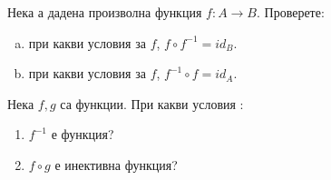 \begin{problem}
  Нека а дадена произволна функция $f:A \to B$.
  Проверете:
  \begin{enumerate}[a)]
  \item
    при какви условия за $f$, $f\circ f^{-1} = id_{B}$.
  \item
     при какви условия за $f$, $f^{-1}\circ f = id_{A}$.
  \end{enumerate}
\end{problem}
\newpage
\begin{problem}%
  Нека $f,g$ са функции. При какви условия :
  \begin{enumerate}
  \item
    $f^{-1}$ е функция?
  \item
    $f\circ g$ е инективна функция?
  \end{enumerate}
\end{problem}

